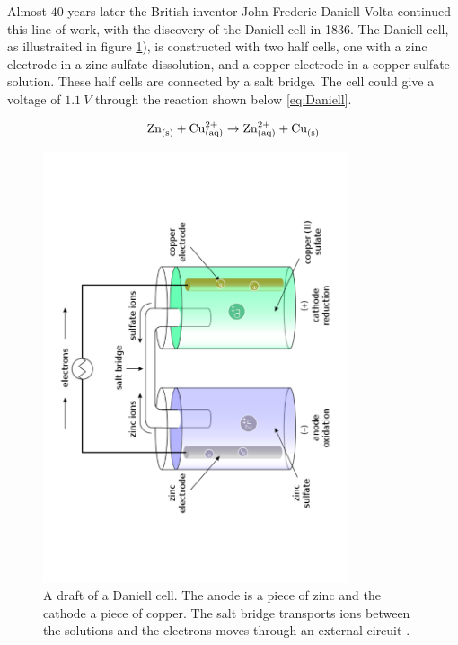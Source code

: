 Almost $40$ years later the British inventor John Frederic Daniell Volta continued this line of work, with the discovery of the Daniell cell \cite{daniell1836xi} in 1836. The Daniell cell, as illustraited in figure \ref{fig:DaniellCell}), is constructed with two half cells, one with a zinc electrode in a zinc sulfate dissolution, and a copper electrode in a copper sulfate solution. These half cells are connected by a salt bridge. The cell could give a voltage of $\SI{1.1}{V}$ through the reaction shown below \ref{eq:Daniell}. 


\begin{align}\label{eq:Daniell}
\ce{Zn_{(s)}} + \ce{Cu^{2+}_{(aq)}} \rightarrow \ce{Zn^2+_{(aq)}} + \ce{Cu_{(s)}} 
\end{align}

\begin{figure}[ht]
    \centering
    \includegraphics[angle=270,width=0.8\textwidth]{600px-Galvanic_cell_labeled.pdf}
    \caption[format=plain]{A draft of a Daniell cell. The anode is a piece of zinc and the cathode a piece of copper. The salt bridge transports ions between the solutions and the electrons moves through an external circuit \cite{wiki:Daniellcell}. }
    \label{fig:DaniellCell}
\end{figure}


